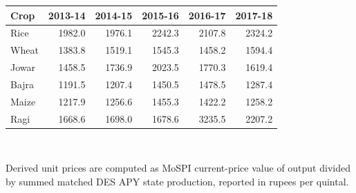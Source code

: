 \begin{small}
\begin{tabular}{lrrrrr}
\toprule
Crop & 2013-14 & 2014-15 & 2015-16 & 2016-17 & 2017-18 \\
\midrule
Rice & 1982.0 & 1976.1 & 2242.3 & 2107.8 & 2324.2 \\
Wheat & 1383.8 & 1519.1 & 1545.3 & 1458.2 & 1594.4 \\
Jowar & 1458.5 & 1736.9 & 2023.5 & 1770.3 & 1619.4 \\
Bajra & 1191.5 & 1207.4 & 1450.5 & 1478.5 & 1287.4 \\
Maize & 1217.9 & 1256.6 & 1455.3 & 1422.2 & 1258.2 \\
Ragi & 1668.6 & 1698.0 & 1678.6 & 3235.5 & 2207.2 \\
\bottomrule
\end{tabular}
\\[0.3em]
\parbox{0.95\linewidth}{\footnotesize Derived unit prices are computed as MoSPI current-price value of output divided by summed matched DES APY state production, reported in rupees per quintal.}
\end{small}

